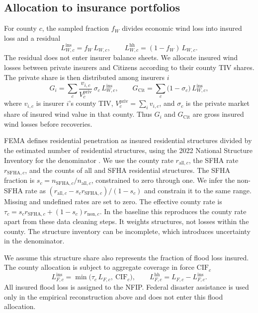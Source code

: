 \subsection*{Allocation to insurance portfolios}\label{MethodsRiskAbsorption}
For county $c$, the sampled fraction $f_W$ divides economic wind loss into insured loss and a residual
\begin{equation}
L^{\mathrm{ins}}_{W,c} = f_W\, L_{W,c},
\qquad
L^{\mathrm{hh}}_{W,c} = (1-f_W)\, L_{W,c}.
\end{equation}
The residual does not enter insurer balance sheets. We allocate insured wind losses between private insurers and Citizens according to their county TIV shares. The private share is then distributed among insurers $i$
\begin{equation}
G_i = \sum_c \frac{v_{i,c}}{V^{\mathrm{priv}}_c}\,\sigma_c\, L^{\mathrm{ins}}_{W,c},
\qquad
G_{\mathrm{Cit}} = \sum_c \big(1-\sigma_c\big)\, L^{\mathrm{ins}}_{W,c},
\end{equation}
where $v_{i,c}$ is insurer $i$'s county TIV, $V^{\mathrm{priv}}_c=\sum_i v_{i,c}$, and $\sigma_c$ is the private market share of insured wind value in that county. Thus $G_i$ and $G_{\mathrm{Cit}}$ are gross insured wind losses before recoveries.

FEMA defines residential penetration as insured residential structures divided by the estimated number of residential structures, using the 2022 National Structure Inventory for the denominator \cite{fema_nfip_penetration_2025}. We use the county rate $r_{\mathrm{all},c}$, the SFHA rate $r_{\mathrm{SFHA},c}$, and the counts of all and SFHA residential structures. The SFHA fraction is $s_c=n_{\mathrm{SFHA},c}/n_{\mathrm{all},c}$, constrained to zero through one. We infer the non-SFHA rate as $(r_{\mathrm{all},c}-s_c r_{\mathrm{SFHA},c})/(1-s_c)$ and constrain it to the same range. Missing and undefined rates are set to zero. The effective county rate is $\tau_c=s_c r_{\mathrm{SFHA},c}+(1-s_c)r_{\mathrm{non},c}$. In the baseline this reproduces the county rate apart from these data cleaning steps. It weights structures, not losses within the county. The structure inventory can be incomplete, which introduces uncertainty in the denominator.

We assume this structure share also represents the fraction of flood loss insured. The county allocation is subject to aggregate coverage in force $\mathrm{CIF}_c$
\begin{equation}
L^{\mathrm{ins}}_{F,c} = \min\!\big(\tau_c\, L_{F,c},\ \mathrm{CIF}_c\big),
\qquad
L^{\mathrm{hh}}_{F,c} = L_{F,c} - L^{\mathrm{ins}}_{F,c}.
\end{equation}
All insured flood loss is assigned to the NFIP. Federal disaster assistance is used only in the empirical reconstruction above and does not enter this flood allocation.

